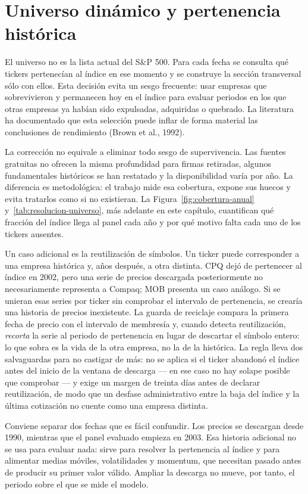 \section{Universo dinámico y pertenencia histórica}

El universo no es la lista actual del S\&P 500. Para cada fecha se consulta qué tickers pertenecían
al índice en ese momento y se construye la sección transversal sólo con ellos. Esta decisión evita
un sesgo frecuente: usar empresas que sobrevivieron y permanecen hoy en el índice para evaluar
periodos en los que otras empresas ya habían sido expulsadas, adquiridas o quebrado. La literatura
ha documentado que esta selección puede inflar de forma material las conclusiones de rendimiento
(Brown et al., 1992).

La corrección no equivale a eliminar todo sesgo de supervivencia. Las fuentes gratuitas no ofrecen la
misma profundidad para firmas retiradas, algunos fundamentales históricos se han restatado y la
disponibilidad varía por año. La diferencia es metodológica: el trabajo mide esa cobertura, expone
sus huecos y evita tratarlos como si no existieran. La Figura~\ref{fig:cobertura-anual}
y~\ref{tab:resolucion-universo}, más adelante en este capítulo, cuantifican qué fracción del índice
llega al panel cada año y por qué motivo falta cada uno de los tickers ausentes.

Un caso adicional es la reutilización de símbolos. Un ticker puede corresponder a una empresa
histórica y, años después, a otra distinta. CPQ dejó de pertenecer al índice en 2002, pero una serie
de precios descargada posteriormente no necesariamente representa a Compaq; MOB presenta un caso
análogo. Si se unieran esas series por ticker sin comprobar el intervalo de pertenencia, se crearía
una historia de precios inexistente. La guarda de reciclaje compara la primera fecha de precio con
el intervalo de membresía y, cuando detecta reutilización, \emph{recorta} la serie al periodo de
pertenencia en lugar de descartar el símbolo entero: lo que sobra es la vida de la otra empresa, no
la de la histórica. La regla lleva dos salvaguardas para no castigar de más: no se aplica si el
ticker abandonó el índice antes del inicio de la ventana de descarga --- en ese caso no hay solape
posible que comprobar --- y exige un margen de treinta días antes de declarar reutilización, de modo
que un desfase administrativo entre la baja del índice y la última cotización no cuente como una
empresa distinta.

Conviene separar dos fechas que es fácil confundir. Los precios se descargan desde 1990, mientras
que el panel evaluado empieza en 2003. Esa historia adicional no se usa para evaluar nada: sirve
para resolver la pertenencia al índice y para alimentar medias móviles, volatilidades y momentum,
que necesitan pasado antes de producir su primer valor válido. Ampliar la descarga no mueve, por
tanto, el periodo sobre el que se mide el modelo.

